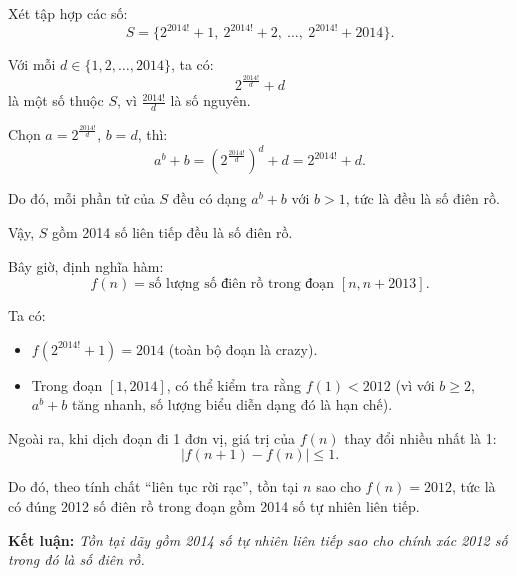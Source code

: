 \documentclass[../09-contruction-methods.tex]{subfiles}
\begin{document}
\begin{soln}\footnotemark
    Xét tập hợp các số:
    \[
        S = \{2^{2014!}+1,\ 2^{2014!}+2,\ \dotsc,\ 2^{2014!}+2014\}.
    \]
    
    Với mỗi \( d \in \{1, 2, \dotsc, 2014\} \), ta có:
    \[
        2^{\frac{2014!}{d}} + d
    \]
    là một số thuộc \( S \), vì \( \frac{2014!}{d} \) là số nguyên.
    
    Chọn \( a = 2^{\frac{2014!}{d}} \), \( b = d \), thì:
    \[
        a^b + b = \left(2^{\frac{2014!}{d}}\right)^d + d = 2^{2014!} + d.
    \]
    
    Do đó, mỗi phần tử của \( S \) đều có dạng \( a^b + b \) với \( b > 1 \), tức là đều là số điên rồ.
    
    Vậy, \( S \) gồm 2014 số liên tiếp đều là số điên rồ.
    
    Bây giờ, định nghĩa hàm:
    \[
        f(n) = \text{số lượng số điên rồ trong đoạn } [n, n+2013].
    \]
    
    Ta có:
    \begin{itemize}[topsep=0pt, partopsep=0pt, itemsep=0pt]
        \item \( f(2^{2014!}+1) = 2014 \) (toàn bộ đoạn là crazy).
        \item Trong đoạn \( [1, 2014] \), có thể kiểm tra rằng \( f(1) < 2012 \) (vì với \( b \ge 2 \), \( a^b + b \) tăng nhanh, số lượng biểu diễn dạng đó là hạn chế).
    \end{itemize}
    
    Ngoài ra, khi dịch đoạn đi 1 đơn vị, giá trị của \( f(n) \) thay đổi nhiều nhất là 1:
    \[
        |f(n+1) - f(n)| \le 1.
    \]
    
    Do đó, theo tính chất “liên tục rời rạc”, tồn tại \( n \) sao cho \( f(n) = 2012 \), tức là có đúng 2012 số điên rồ trong đoạn gồm 2014 số tự nhiên liên tiếp.
    
    \textbf{Kết luận:} \textit{Tồn tại dãy gồm 2014 số tự nhiên liên tiếp sao cho chính xác 2012 số trong đó là số điên rồ.}
\end{soln}

\end{document}
